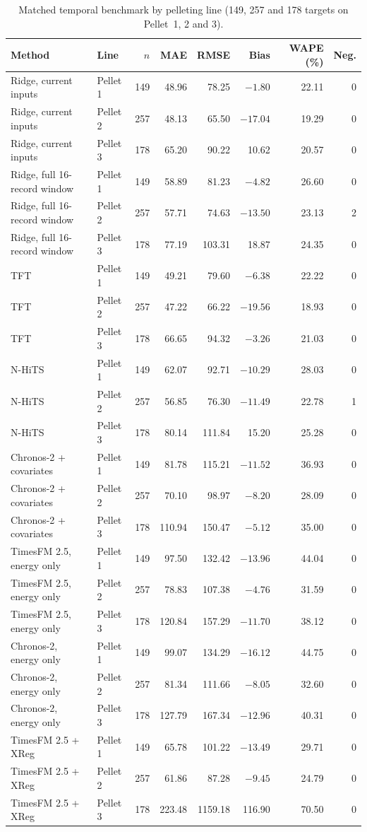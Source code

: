 \begin{table}[!htbp]\centering\scriptsize
\caption{Matched temporal benchmark by pelleting line (149, 257 and 178 targets on Pellet~1, 2 and 3).}\label{tab:s_by_line}
\begin{tabular}{@{}llrrrrrr@{}}\toprule
Method & Line & $n$ & MAE & RMSE & Bias & WAPE (\%) & Neg. \\\midrule
Ridge, current inputs & Pellet 1 & 149 & 48.96 & 78.25 & $-1.80$ & 22.11 & 0 \\
Ridge, current inputs & Pellet 2 & 257 & 48.13 & 65.50 & $-17.04$ & 19.29 & 0 \\
Ridge, current inputs & Pellet 3 & 178 & 65.20 & 90.22 & 10.62 & 20.57 & 0 \\
Ridge, full 16-record window & Pellet 1 & 149 & 58.89 & 81.23 & $-4.82$ & 26.60 & 0 \\
Ridge, full 16-record window & Pellet 2 & 257 & 57.71 & 74.63 & $-13.50$ & 23.13 & 2 \\
Ridge, full 16-record window & Pellet 3 & 178 & 77.19 & 103.31 & 18.87 & 24.35 & 0 \\
TFT & Pellet 1 & 149 & 49.21 & 79.60 & $-6.38$ & 22.22 & 0 \\
TFT & Pellet 2 & 257 & 47.22 & 66.22 & $-19.56$ & 18.93 & 0 \\
TFT & Pellet 3 & 178 & 66.65 & 94.32 & $-3.26$ & 21.03 & 0 \\
N-HiTS & Pellet 1 & 149 & 62.07 & 92.71 & $-10.29$ & 28.03 & 0 \\
N-HiTS & Pellet 2 & 257 & 56.85 & 76.30 & $-11.49$ & 22.78 & 1 \\
N-HiTS & Pellet 3 & 178 & 80.14 & 111.84 & 15.20 & 25.28 & 0 \\
Chronos-2 + covariates & Pellet 1 & 149 & 81.78 & 115.21 & $-11.52$ & 36.93 & 0 \\
Chronos-2 + covariates & Pellet 2 & 257 & 70.10 & 98.97 & $-8.20$ & 28.09 & 0 \\
Chronos-2 + covariates & Pellet 3 & 178 & 110.94 & 150.47 & $-5.12$ & 35.00 & 0 \\
TimesFM 2.5, energy only & Pellet 1 & 149 & 97.50 & 132.42 & $-13.96$ & 44.04 & 0 \\
TimesFM 2.5, energy only & Pellet 2 & 257 & 78.83 & 107.38 & $-4.76$ & 31.59 & 0 \\
TimesFM 2.5, energy only & Pellet 3 & 178 & 120.84 & 157.29 & $-11.70$ & 38.12 & 0 \\
Chronos-2, energy only & Pellet 1 & 149 & 99.07 & 134.29 & $-16.12$ & 44.75 & 0 \\
Chronos-2, energy only & Pellet 2 & 257 & 81.34 & 111.66 & $-8.05$ & 32.60 & 0 \\
Chronos-2, energy only & Pellet 3 & 178 & 127.79 & 167.34 & $-12.96$ & 40.31 & 0 \\
TimesFM 2.5 + XReg & Pellet 1 & 149 & 65.78 & 101.22 & $-13.49$ & 29.71 & 0 \\
TimesFM 2.5 + XReg & Pellet 2 & 257 & 61.86 & 87.28 & $-9.45$ & 24.79 & 0 \\
TimesFM 2.5 + XReg & Pellet 3 & 178 & 223.48 & 1159.18 & 116.90 & 70.50 & 0 \\
\bottomrule
\end{tabular}
\end{table}
